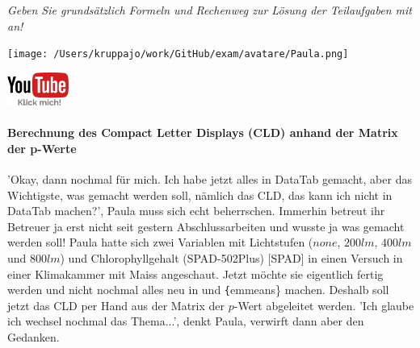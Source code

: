 \documentclass[a4paper, 9pt]{scrartcl}\usepackage[]{graphicx}\usepackage[]{xcolor}
\begin{document}
\textit{Geben Sie grundsätzlich Formeln und Rechenweg zur Lösung der Teilaufgaben mit an!} \\[1Ex]
 

 
\ifcollection
\begin{flushright}
\tiny\vspace{-3Ex}
\textbf{\examinhaltstart}
\exammodulebiostat
\vspace{-4Ex}
\end{flushright}
\begin{minipage}[t]{0.5\textwidth}
\texttt{[image: /Users/kruppajo/work/GitHub/exam/avatare/Paula.png]}
\end{minipage}
\begin{minipage}[t]{0.5\textwidth}
\hfill
\href{https://youtu.be/RagTFFKFbFg}{\includegraphics[width = 2cm]{img/youtube}}
\end{minipage}
\vspace{-3ex}
\fi



\ifcollection
\paragraph{Berechnung des Compact Letter Displays (CLD) anhand der Matrix der p-Werte}
\fi

'Okay, dann nochmal für mich. Ich habe jetzt alles in DataTab gemacht, aber das Wichtigste, was gemacht werden soll, nämlich das CLD, das kann ich nicht in DataTab machen?', Paula muss sich echt beherrschen. Immerhin betreut ihr Betreuer ja erst nicht seit gestern Abschlussarbeiten und wusste ja was gemacht werden soll! Paula hatte sich zwei Variablen mit Lichtstufen ($none$, $200lm$, $400lm$ und $800lm$) und Chlorophyllgehalt (SPAD-502Plus) [SPAD] in einen Versuch in einer Klimakammer mit Maiss angeschaut. Jetzt möchte sie eigentlich fertig werden und nicht nochmal alles neu in \Rlogo und \texttt\{emmeans\} machen. Deshalb soll jetzt das CLD per Hand aus der Matrix der $p$-Wert abgeleitet werden. 'Ich glaube ich wechsel nochmal das Thema...', denkt Paula, verwirft dann aber den Gedanken.
\end{document}
